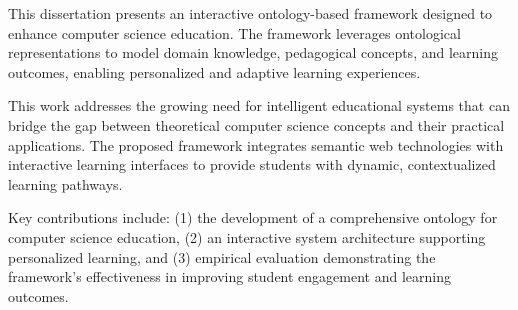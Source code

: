This dissertation presents an interactive ontology-based framework designed to enhance computer science education. The framework leverages ontological representations to model domain knowledge, pedagogical concepts, and learning outcomes, enabling personalized and adaptive learning experiences. 

\vspace{1em}

This work addresses the growing need for intelligent educational systems that can bridge the gap between theoretical computer science concepts and their practical applications. The proposed framework integrates semantic web technologies with interactive learning interfaces to provide students with dynamic, contextualized learning pathways.

\vspace{1em}

Key contributions include: (1) the development of a comprehensive ontology for computer science education, (2) an interactive system architecture supporting personalized learning, and (3) empirical evaluation demonstrating the framework's effectiveness in improving student engagement and learning outcomes.
